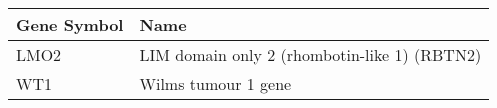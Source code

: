 \begin{tabular}{ll}
\toprule
Gene Symbol &                                         Name \\
\midrule
       LMO2 & LIM domain only 2 (rhombotin-like 1) (RBTN2) \\
        WT1 &                          Wilms tumour 1 gene \\
\bottomrule
\end{tabular}
